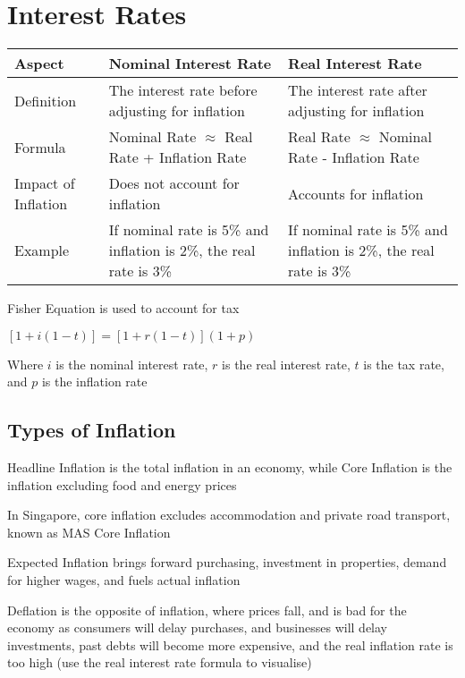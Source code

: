 \section{Interest Rates}


\begin{tabularx}{\linewidth}{X X X}
\toprule
\textbf{Aspect} & \textbf{Nominal Interest Rate} & \textbf{Real Interest Rate} \\
\midrule
Definition & The interest rate before adjusting for inflation & The interest rate after adjusting for inflation \\
\midrule
Formula & Nominal Rate $\approx$ Real Rate + Inflation Rate & Real Rate $\approx$ Nominal Rate - Inflation Rate \\
\midrule
Impact of Inflation & Does not account for inflation & Accounts for inflation \\
\midrule
Example & If nominal rate is 5\% and inflation is 2\%, the real rate is 3\% & If nominal rate is 5\% and inflation is 2\%, the real rate is 3\% \\
\bottomrule
\end{tabularx}

Fisher Equation is used to account for tax

$[1+i(1-t)] = [1+r(1-t)](1+p)$

Where $i$ is the nominal interest rate, $r$ is the real interest rate, $t$ is the tax rate, and $p$ is the inflation rate

\subsection{Types of Inflation}
Headline Inflation is the total inflation in an economy, while Core Inflation is the inflation excluding food and energy prices

\begin{callout}
    In Singapore, core inflation excludes accommodation and private road transport, known as MAS Core Inflation
\end{callout}

Expected Inflation brings forward purchasing, investment in properties, demand for higher wages, and fuels actual inflation

Deflation is the opposite of inflation, where prices fall, and is bad for the economy as consumers will delay purchases, 
and businesses will delay investments, past debts will become more expensive, and the real inflation rate is too high
(use the real interest rate formula to visualise)

